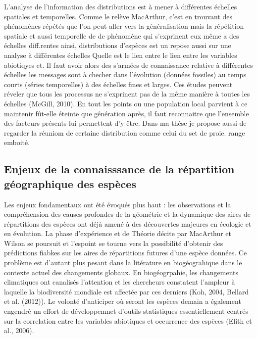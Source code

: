 L'analyse de l'information des distributions est à mener à différentes
échelles spatiales et temporelles. Comme le relève MacArthur, c'est en
trouvant des phénomènes répétés que l'on peut aller vers la
généralisation mais la répétition spatiale et aussi temporelle de de
phénomène qui s'exprinent eux même a des échelles diff.rentes ainsi,
distributions d'espèces est un repose aussi sur une analyse à
différentes échelles Quelle est le lien entre le lien entre les
variables abiotiqyes et. Il faut avoir alors des s'armées de
connaissance relative à différentes échelles les messages sont à checher
dans l'évolution (données fossiles) au temps courts (séries temporelles)
à des échelles fines et larges. Ces études peuvent réveler que tous les
processus ne s'exprinent pas de la même manière à toutes les échelles
(McGill, 2010). En tout les points ou une population local parvient à ce
maintenir fût-elle éteinte que génération après, il faut reconnaitre que
l'ensemble des facteurs présents lui permettent d'y être. Dans ma thèse
je propose aussi de regarder la réuniom de certaine distribution comme
celui du set de proie. range emboité.

\subsection*{Enjeux de la connaisssance de la répartition géographique
des
espèces}\label{enjeux-de-la-connaisssance-de-la-ruxe9partition-guxe9ographique-des-espuxe8ces}

Les enjeux fondamentaux ont été évoqués plus haut : les observations et
la compréhension des causes profondes de la géométrie et la dynamique
des aires de répartitions des espèces ont déjà amené à des découvertes
majeures en écologie et en évolution. La phase d'expérience et de
Théorie décite par MacArthur et Wilson se poursuit et l'espoint se
tourne vers la possibilité d'obtenir des prédictions fiabkes sur les
aires de répartitions futures d'une espèce données. Ce problème est
d'autant plus pesant dans la litérature en biogéograhique dans le
contexte actuel des changements globaux. En biogéogrpahie, les
changements climatiques ont canalisés l'attention et les chercheurs
constatent l'ampleur à laquelle la biodiversité mondiale est affectée
par ces derniers (Koh, 2004, Bellard et al. (2012)). Le volonté
d'anticiper où seront les espèces demain a également engendré un effort
de développemnet d'outils statistiques essentiellement centrés sur la
correlation entre les variables abiotiques et occurrence des espèces
(Elith et al., 2006).

